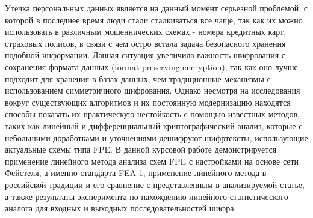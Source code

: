 \Introduction

 Утечка персональных данных является на данный момент серьезной проблемой, с которой в последнее время люди стали сталкиваться все чаще, так как их можно использовать в различным мошеннических схемах - номера кредитных карт, страховых полисов, в связи с чем остро встала задача безопасного хранения подобной информации. Данная ситуация увеличила важность шифрования с сохранения формата данных (format-preserving encryption), так как оно лучше подходит для хранения в базах данных, чем традиционные механизмы с использованием симметричного шифрования. Однако несмотря на исследования вокруг существующих алгоритмов и их постоянную модернизацию находятся способы показать их практическую нестойкость с помощью известных методов, таких как линейный и дифференциальный криптографический анализ, которые с небольшими доработками и уточнениями дешифруют шифртексты, использующие актуальные схемы типа FPE. В данной курсовой работе демонстрируется применение линейного метода анализа схем FPE с настройками на основе сети Фейстеля, а именно стандарта FEA-1, применение линейного метода в российской традиции и его сравнение с представленным в анализируемой статье, а также результаты эксперимента по нахождению линейного статистического аналога для входных и выходных последовательностей шифра.
